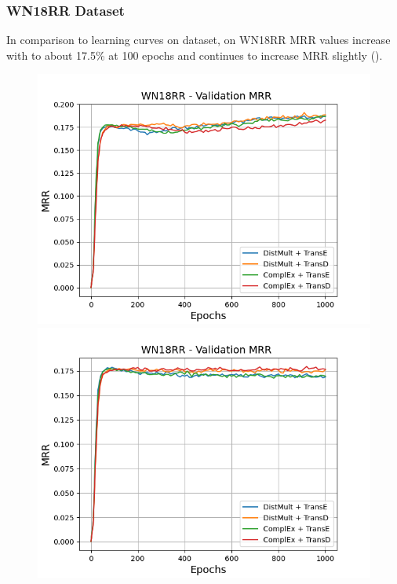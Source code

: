 \subsubsection{WN18RR Dataset}
\label{subsubsec:uncertainty_wn18rr}
%
In comparison to learning curves on \umls dataset, on \textsc{WN18RR} MRR values increase with \origsampling to about 17.5\% at 100 epochs and continues to increase MRR slightly ().
\begin{figure}
    \centering
    \begin{minipage}{.5\textwidth}
      \centering
      \includegraphics[width=0.9\linewidth]{figures/results/gan_train/not_pretrained/random/wn18rr/epochs1000/random_wn18rr_mrrs.png}
    \end{minipage}%
    \begin{minipage}{.5\textwidth}
      \centering
      \includegraphics[width=0.9\linewidth]{figures/results/gan_train/not_pretrained/uncertainty/max_distribution/entropy/wn18rr/1k_epochs/uncertainty_wn18rr_mrrs.png}

\end{minipage}
\end{figure}

